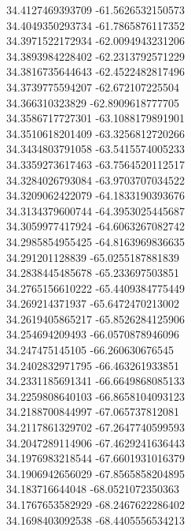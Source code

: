 {34.4127469393709	-61.5626532150573\\
34.4049350293734	-61.7865876117352\\
34.3971522172934	-62.0094943231206\\
34.3893984228402	-62.2313792571229\\
34.3816735644643	-62.4522482817496\\
34.3739775594207	-62.672107225504\\
34.366310323829	-62.8909618777705\\
34.3586717727301	-63.1088179891901\\
34.3510618201409	-63.3256812720266\\
34.3434803791058	-63.5415574005233\\
34.3359273617463	-63.7564520112517\\
34.3284026793084	-63.9703707034522\\
34.3209062422079	-64.1833190393676\\
34.3134379600744	-64.3953025445687\\
34.3059977417924	-64.6063267082742\\
34.2985854955425	-64.8163969836635\\
34.291201128839	-65.0255187881839\\
34.2838445485678	-65.233697503851\\
34.2765156610222	-65.4409384775449\\
34.269214371937	-65.6472470213002\\
34.2619405865217	-65.8526284125906\\
34.254694209493	-66.0570878946096\\
34.247475145105	-66.260630676545\\
34.2402832971795	-66.463261933851\\
34.2331185691341	-66.6649868085133\\
34.2259808640103	-66.8658104093123\\
34.2188700844997	-67.065737812081\\
34.2117861329702	-67.2647740599593\\
34.2047289114906	-67.4629241636443\\
34.1976983218544	-67.6601931016379\\
34.1906942656029	-67.8565858204895\\
34.183716644048	-68.0521072350363\\
34.1767653582929	-68.2467622286402\\
34.1698403092538	-68.4405556534213\\
}
